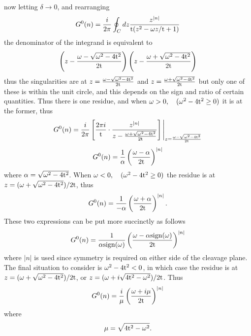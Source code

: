 \documentclass[a4paper, 12pt]{article}
\begin{document}
now letting $\delta \longrightarrow 0$, and rearranging
\begin{equation}
	G^0 (n) = \frac{i}{2\pi}\oint_C dz\frac{z^{|n|}}{{\rm t}(z^2 -\omega z/{\rm t}+1)} 
\end{equation}
the denominator of the integrand is equivalent to
\begin{equation}
	\left(z-\frac{\omega-\sqrt{\omega^2 -4{\rm t}^2}}{2{\rm t}} \right)\left(z-\frac{\omega+\sqrt{\omega^2 -4{\rm t}^2}}{2{\rm t}} \right)
\end{equation}
thus the singularities are at $z=\frac{\omega-\sqrt{\omega^2 -4{\rm t}^2}}{2{\rm t}}$ and $z=\frac{\omega+\sqrt{\omega^2 -4{\rm t}^2}}{2{\rm t}}$ but only one of these is within the unit circle, and this depends on the sign and ratio of certain quantities. Thus there is one residue, and when $\omega > 0, \quad (\omega^2 -4{\rm t}^2 \geq 0)$ it is at the former, thus
\begin{equation}
	G^0 (n) = \frac{i}{2\pi}\left[\frac{2\pi i}{\rm t} \cdot \frac{z^{|n|}}{z-\frac{\omega+\sqrt{\omega^2 -4{\rm t}^2}}{2{\rm t}}}\right]\Bigg|_{z = \frac{\omega-\sqrt{\omega^2-4{\rm t}^2}}{2{\rm t}}}
\end{equation}
\begin{equation}
G^0 (n) = \frac{1}{\alpha}\left( \frac{\omega-\alpha}{2\rm t}\right)^{|n|} 
\end{equation}
where $ \alpha = \sqrt{\omega^2-4{\rm t}^2} $.
When $\omega < 0, \quad (\omega^2 -4{\rm t}^2 \geq 0)$ the residue is at $z=(\omega+\sqrt{\omega^2 -4{\rm t}^2})/2\rm t$, thus
\begin{equation}
G^0 (n) = \frac{1}{-\alpha}\left( \frac{\omega+\alpha}{2\rm t}\right)^{|n|}  .
\end{equation}
These two expressions can be put more succinctly as follows
\begin{equation}
	G^0 (n) = \frac{1}{\alpha \rm{sign}(\omega)}\left( \frac{\omega-\alpha \rm{sign}(\omega)}{2\rm t}\right)^{|n|}\label{alpha}
\end{equation}
where $|n|$ is used since symmetry is required on either side of the cleavage plane.
The final situation to consider is $\omega^2 -4{\rm t}^2 < 0$, in which case the residue is at $z=(\omega+\sqrt{\omega^2 -4{\rm t}^2})/2\rm t$, or $z=(\omega +i\sqrt{4{\rm t}^2-\omega^2})/2\rm t$. Thus
\begin{equation}\label{mu}
G^0 (n) = \frac{i}{\mu}\left( \frac{\omega+i\mu}{2\rm t}\right)^{|n|} 
\end{equation}
where 
\begin{equation}
	\mu = \sqrt{4{\rm t}^2-\omega^2} .
\end{equation}
\end{document}
